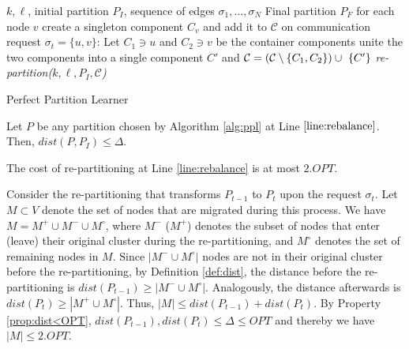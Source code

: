 \begin{algorithm}
	\renewcommand{\algorithmicrequire}{\textbf{Input:}}
	\renewcommand{\algorithmicensure}{\textbf{Output:}}
	\begin{algorithmic}[1]
		\Require 
		$k, \ell$,
		initial partition $P_I$,
		sequence of  edges $\sigma_1, \dots, \sigma_N$ 
		\Ensure Final partition $P_F$ 
		\State for each node $v$ create a singleton component $C_v$ and add it to $\mathcal{C}$ \label{line:initcomponents}
		\State on communication request $\sigma_t=\{u,v\}$:
		\State Let $C_1 \ni u$ and $C_2 \ni v$ be the container components
		\State unite the two components into a single component $C'$ and
		$\mathcal{C} = (\mathcal{C}\setminus\{C_1, C_2\}) \cup ~\{C'\}$ \label{line:mergecomponents}
		\State \textit{re-partition($k, \ell, P_I, \mathcal{C}$)} \label{line:rebalance} 
		\EndIf
		\EndIf
	\end{algorithmic}
	\caption{Perfect Partition Learner}
	\label{alg:ppl}
      \end{algorithm}



\begin{property} \label{prop:dist<OPT}
	Let $P$ be any partition chosen by Algorithm \ref{alg:ppl} at Line $\ref{line:rebalance}$.
	Then, $dist(P,P_I) \leq \Delta$.
\end{property}

\begin{lemma}	\label{lemma:rebalancecost}
	The cost of re-partitioning at Line \ref{line:rebalance} is at most $2.OPT$.
\end{lemma}
\begin{IEEEproof}
	Consider the re-partitioning that transforms $P_{t-1}$ to $P_t$ upon the request $\sigma_t$.
	Let $M \subset V$ denote the set of nodes that are migrated during this process.
	We have $M = M^+ \cup M^- \cup M^\circ$,
	where $M^-$ ($M^+$) denotes the subset of nodes that
	enter (leave) their original cluster during the re-partitioning,
	and $M^\circ$ denotes the set of remaining nodes in $M$.
	Since $|M^- \cup M^\circ|$ nodes are not in their original cluster before the re-partitioning,
	by Definition \ref{def:dist},
	the distance before the re-partitioning is $dist(P_{t-1}) \geq | M^- \cup M^\circ |$.
	Analogously,
	 the distance afterwards is $dist(P_{t}) \geq | M^+ \cup M^\circ |$.
	Thus,
	$|M| \leq dist(P_{t-1}) + dist(P_{t})$.
	By Property \ref{prop:dist<OPT},
	$dist(P_{t-1}) , dist(P_{t}) \leq \Delta \leq OPT$
	and thereby we have	
	$|M| \leq 2.OPT$.
\end{IEEEproof}

